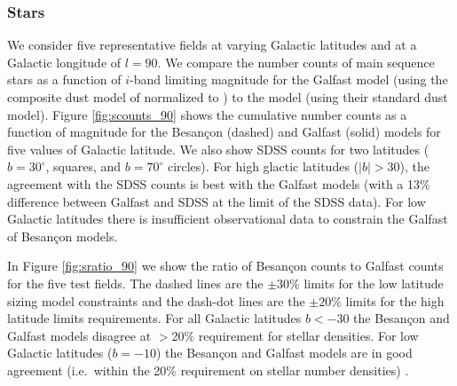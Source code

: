 \documentclass[11pt]{article}
\begin{document}
\subsubsection{Stars}
We consider five representative fields at varying Galactic latitudes
and at a Galactic longitude of $l=90$.  We compare the number counts
of main sequence stars as a function of $i$-band limiting magnitude
for the Galfast model \citep{juric} (using the composite dust model of
\citet{amores05} normalized to \citet{schlegel98}) to the
\citet{besancon} model (using their standard dust model).  Figure
\ref{fig:scounts_90} shows the cumulative number counts as a function
of magnitude for the Besan\c{c}on (dashed) and Galfast (solid) models
for five values of Galactic latitude.  We also show SDSS counts for two
latitudes ($b=30^{\circ}$, squares, and $b=70^{\circ}$ circles).  For
high glactic latitudes ($|b| >30$), the agreement with the SDSS counts
is best with the Galfast models (with a 13\% difference between
Galfast and SDSS at the limit of the SDSS data). For low Galactic
latitudes there is insufficient observational data to constrain the
Galfast of Besan\c{c}on models.

In Figure \ref{fig:sratio_90} we show the ratio of Besan\c{c}on counts
to Galfast counts for the five test fields.  The dashed lines are the
$\pm30\%$ limits for the low latitude sizing model constraints and the
dash-dot lines are the $\pm20\%$ limits for the high latitude limits
requirements.  For all Galactic latitudes $b<-30$ the Besan\c{c}on and
Galfast models disagree at $>$20\% requirement for stellar
densities. For low Galactic latitudes ($b=-10$) the Besan\c{c}on and
Galfast models are in good agreement (i.e.\ within the 20\%
requirement on stellar number densities) .


\end{document}
